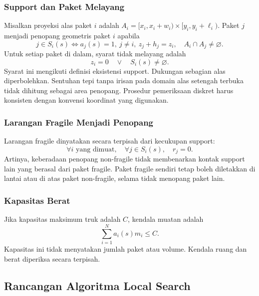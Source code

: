 \documentclass[11pt,a4paper]{article}
\begin{document}
\subsubsection{Support dan Paket Melayang}
Misalkan proyeksi alas paket $i$ adalah
$A_i=[x_i,x_i+w_i)\times[y_i,y_i+\ell_i)$.
Paket $j$ menjadi penopang geometris paket $i$ apabila
\begin{equation}
 j\in S_i(s)\iff a_j(s)=1,\ j\ne i,\ z_j+h_j=z_i,
 \quad A_i\cap A_j\ne\varnothing.
\end{equation}
Untuk setiap paket di dalam, syarat tidak melayang adalah
\begin{equation}
 z_i=0\quad\lor\quad S_i(s)\ne\varnothing.\label{eq:support}
\end{equation}
Syarat ini mengikuti definisi eksistensi support. Dukungan sebagian alas
diperbolehkan. Sentuhan tepi tanpa irisan pada domain alas setengah terbuka
tidak dihitung sebagai area penopang. Prosedur pemeriksaan diskret harus
konsisten dengan konvensi koordinat yang digunakan.

\subsubsection{Larangan Fragile Menjadi Penopang}
Larangan fragile dinyatakan secara terpisah dari kecukupan support:
\begin{equation}
 \forall i\text{ yang dimuat},\quad \forall j\in S_i(s),\quad r_j=0.
\end{equation}
Artinya, keberadaan penopang non-fragile tidak membenarkan kontak support lain
yang berasal dari paket fragile. Paket fragile sendiri tetap boleh diletakkan
di lantai atau di atas paket non-fragile, selama tidak menopang paket lain.

\subsubsection{Kapasitas Berat}
Jika kapasitas maksimum truk adalah $C$, kendala muatan adalah
\begin{equation}
 \sum_{i=1}^{N}a_i(s)m_i\leq C.\label{eq:berat}
\end{equation}
Kapasitas ini tidak menyatakan jumlah paket atau volume. Kendala ruang dan
berat diperiksa secara terpisah.

\subsection{Rancangan Algoritma Local Search}
\par\pagebreak[0]
\end{document}
